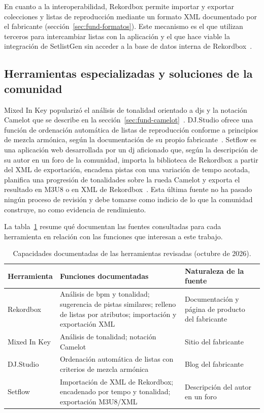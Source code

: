 En cuanto a la interoperabilidad, Rekordbox permite importar y exportar colecciones y listas de reproducción mediante un formato XML documentado por el fabricante (sección~\ref{sec:fund-formatos}). Este mecanismo es el que utilizan terceros para intercambiar listas con la aplicación y el que hace viable la integración de SetlistGen sin acceder a la base de datos interna de Rekordbox~\cite{pyrekordbox_xml}.

\subsection{Herramientas especializadas y soluciones de la comunidad}

Mixed In Key popularizó el análisis de tonalidad orientado a \acsp{dj} y la notación Camelot que se describe en la sección~\ref{sec:fund-camelot}~\cite{mixedinkey_camelot}. DJ.Studio ofrece una función de ordenación automática de listas de reproducción conforme a principios de mezcla armónica, según la documentación de su propio fabricante~\cite{djstudio_camelot}. Setflow es una aplicación web desarrollada por un \acs{dj} aficionado que, según la descripción de su autor en un foro de la comunidad, importa la biblioteca de Rekordbox a partir del XML de exportación, encadena pistas con una variación de tempo acotada, planifica una progresión de tonalidades sobre la rueda Camelot y exporta el resultado en M3U8 o en XML de Rekordbox~\cite{setflow}. Esta última fuente no ha pasado ningún proceso de revisión y debe tomarse como indicio de lo que la comunidad construye, no como evidencia de rendimiento.

La tabla~\ref{tab:eda-herramientas} resume qué documentan las fuentes consultadas para cada herramienta en relación con las funciones que interesan a este trabajo.

\begin{table}[htbp]
  \centering
  \caption{Capacidades documentadas de las herramientas revisadas (octubre de 2026).}
  \label{tab:eda-herramientas}
  \small
  \begin{tabularx}{\textwidth}{|l|X|X|}
    \hline
    \textbf{Herramienta} & \textbf{Funciones documentadas} & \textbf{Naturaleza de la fuente} \\
    \hline
    Rekordbox & Análisis de \acs{bpm} y tonalidad; sugerencia de pistas similares; relleno de listas por atributos; importación y exportación XML & Documentación y página de producto del fabricante~\cite{rekordbox_features,pyrekordbox_xml} \\
    \hline
    Mixed In Key & Análisis de tonalidad; notación Camelot & Sitio del fabricante~\cite{mixedinkey_camelot} \\
    \hline
    DJ.Studio & Ordenación automática de listas con criterios de mezcla armónica & Blog del fabricante~\cite{djstudio_camelot} \\
    \hline
    Setflow & Importación de XML de Rekordbox; encadenado por tempo y tonalidad; exportación M3U8/XML & Descripción del autor en un foro~\cite{setflow} \\
    \hline
  \end{tabularx}
\end{table}


